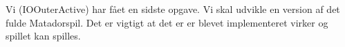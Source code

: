 Vi (IOOuterActive) har fået en sidste opgave. Vi skal udvikle en version af det fulde Matadorspil. Det er vigtigt at det er er blevet implementeret virker og spillet kan spilles.
